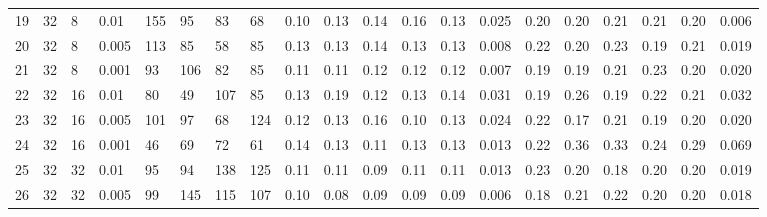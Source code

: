 \begin{landscape}
\begin{longtable}{llllllllllllllllllll}
19 & 32 & 8  & 0.01  & 155 & 95  & 83  & 68  & 0.10 & 0.13 & 0.14 & 0.16 & 0.13 & 0.025 & 0.20 & 0.20 & 0.21 & 0.21 & 0.20 & 0.006 \\
20 & 32 & 8  & 0.005 & 113 & 85  & 58  & 85  & 0.13 & 0.13 & 0.14 & 0.13 & 0.13 & 0.008 & 0.22 & 0.20 & 0.23 & 0.19 & 0.21 & 0.019 \\
21 & 32 & 8  & 0.001 & 93  & 106 & 82  & 85  & 0.11 & 0.11 & 0.12 & 0.12 & 0.12 & 0.007 & 0.19 & 0.19 & 0.21 & 0.23 & 0.20 & 0.020 \\
22 & 32 & 16 & 0.01  & 80  & 49  & 107 & 85  & 0.13 & 0.19 & 0.12 & 0.13 & 0.14 & 0.031 & 0.19 & 0.26 & 0.19 & 0.22 & 0.21 & 0.032 \\
23 & 32 & 16 & 0.005 & 101 & 97  & 68  & 124 & 0.12 & 0.13 & 0.16 & 0.10 & 0.13 & 0.024 & 0.22 & 0.17 & 0.21 & 0.19 & 0.20 & 0.020 \\
24 & 32 & 16 & 0.001 & 46  & 69  & 72  & 61  & 0.14 & 0.13 & 0.11 & 0.13 & 0.13 & 0.013 & 0.22 & 0.36 & 0.33 & 0.24 & 0.29 & 0.069 \\
25 & 32 & 32 & 0.01  & 95  & 94  & 138 & 125 & 0.11 & 0.11 & 0.09 & 0.11 & 0.11 & 0.013 & 0.23 & 0.20 & 0.18 & 0.20 & 0.20 & 0.019 \\
26 & 32 & 32 & 0.005 & 99  & 145 & 115 & 107 & 0.10 & 0.08 & 0.09 & 0.09 & 0.09 & 0.006 & 0.18 & 0.21 & 0.22 & 0.20 & 0.20 & 0.018
\end{longtable}
\end{landscape}
